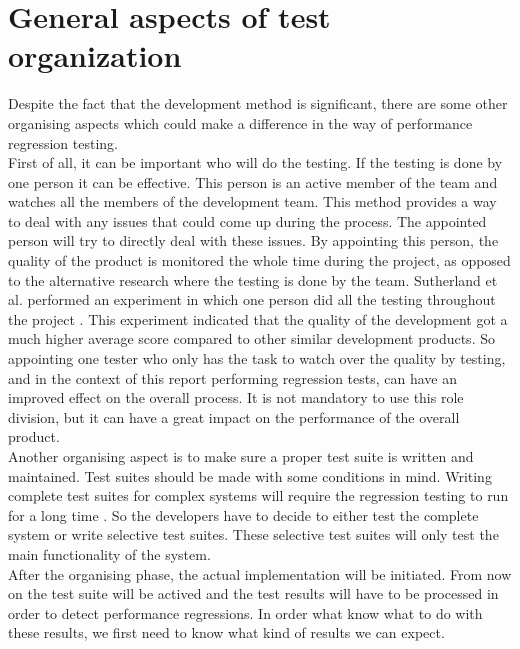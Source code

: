 \section{General aspects of test organization}
Despite the fact that the development method is significant, there are some other organising aspects which could make a difference in the way of performance regression testing. \\
First of all, it can be important who will do the testing. If the testing is done by one person it can be effective. This person is an active member of the team and watches all the members of the development team. This method provides a way to deal with any issues that could come up during the process. The appointed person will try to directly deal with these issues. By appointing this person, the quality of the product is monitored the whole time during the project, as opposed to the alternative research where the testing is done by the team.  Sutherland et al. performed an experiment in which one person did all the testing throughout the project \cite{sutherland2009fully}. This experiment indicated that the quality of the development got a much higher average score compared to other similar development products. So appointing one tester who only has the task to watch over the quality by testing, and in the context of this report performing regression tests, can have an improved effect on the overall process. It is not mandatory to use this role division, but it can have a great impact on the performance of the overall product. \\

Another organising aspect is to make sure a proper test suite is  written and maintained. Test suites should be made with some conditions in mind. Writing complete test suites for complex systems will require the regression testing to run for a long time \cite{rothermel2001prioritizing}. So the developers have to decide to either test the complete system or write selective test suites. These selective test suites will only test the main functionality of the system. \\
After the organising phase, the actual implementation will be initiated. From now on the test suite will be actived and the test results will have to be processed in order to detect performance regressions. In order what know what to do with these results, we first need to know what kind of results we can expect. 
